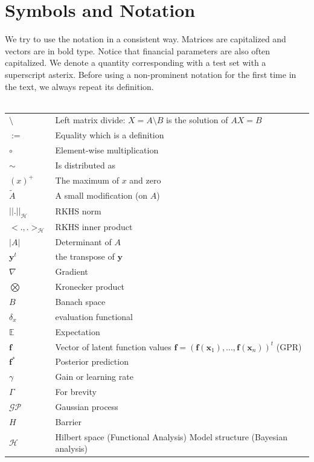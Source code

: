 \documentclass[12pt,a4paper,oneside]{book}
\begin{document}
\newpage

\section{Symbols and Notation}

We try to use the notation in a consistent way. Matrices are capitalized and vectors are in bold type. Notice that financial parameters are also often capitalized. We denote a quantity corresponding with a test set with a superscript asterix. Before using a non-prominent notation for the first time in the text, we always repeat its definition.  
\\
\\
\begin{tabular}{ll}
$\setminus$ &   Left matrix divide: $X = A \setminus B$ is the solution of $A X = B$  \\
$:=$ &  Equality which is a definition   \\
$\circ$ & Element-wise multiplication \\
$\sim$ &   Is distributed as \\
$(x)^+$ & The maximum of $x$ and zero \\
$\tilde{A}$ & A small modification (on $A$) \\
$||.||_{\mathcal{H}}$ &  RKHS norm   \\
$<.,.>_{\mathcal{H}}$ &  RKHS inner product  \\
$|A|$ & Determinant of $A$ \\
$\bm{y}^t$ &   the transpose of $\bm{y}$ \\
$\nabla$ & Gradient   \\
$\bigotimes$ &  Kronecker product  \\
$B$ & Banach space \\
$\delta_x$ & evaluation functional   \\
$\mathbb{E}$ &  Expectation  \\
$\bm{f}$ & Vector of latent function values $\bm{f} = (\bm{f}(\bm{x}_1), \ldots,\bm{f}( \bm{x}_n))^t$ (GPR)   \\
$\bm{f}^{\ast}$ &    Posterior prediction  \\
$\gamma$ & Gain or learning rate \\
$\Gamma$ & For brevity \\
$\mathcal{GP}$ & Gaussian process   \\
$H$ & Barrier \\
$\mathcal{H}$& Hilbert space (Functional Analysis)  Model structure (Bayesian analysis)  \\

\end{tabular}
\end{document}
